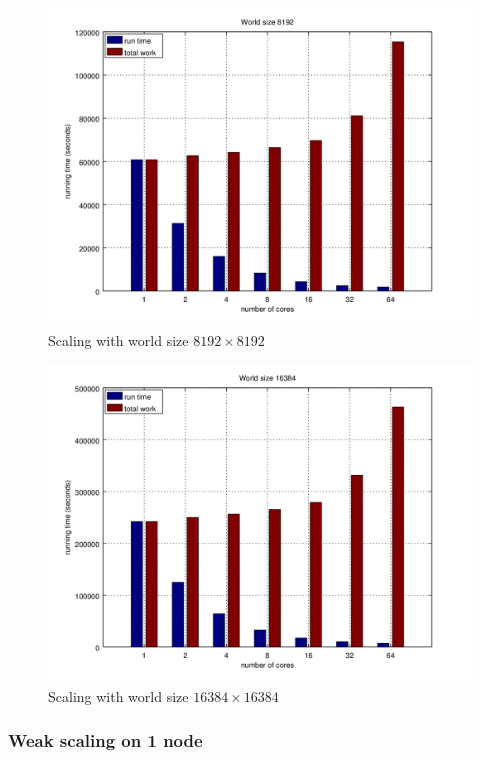 \documentclass[a4paper]{article}
\begin{document}
\begin{figure}
    \centering
    \includegraphics[width=\textwidth]{scaling-8192}
    \caption{Scaling with world size $8192 \times 8192$}
\end{figure}

\begin{figure}
    \centering
    \includegraphics[width=\textwidth]{scaling-16384}
    \caption{Scaling with world size $16384 \times 16384$}
\end{figure}


\subsubsection{Weak scaling on 1 node}
\end{document}
